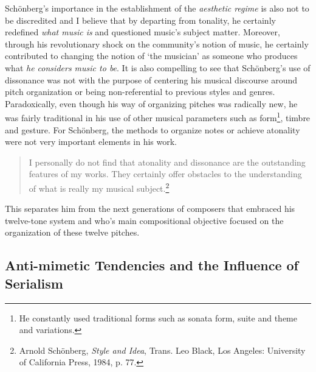 Sch\"{o}nberg's importance in the establishment of the \emph{aesthetic regime} is also not to be discredited and I believe that by departing from tonality, he certainly redefined \emph{what music is} and questioned music's subject matter. Moreover, through his revolutionary shock on the community's notion of music, he certainly contributed to changing the notion of `the musician' as someone who produces what \emph{he considers music to be}. It is also compelling to see that Sch\"{o}nberg's use of dissonance was not with the purpose of centering his musical discourse around pitch organization or being non-referential to previous styles and genres. Paradoxically, even though his way of organizing pitches was radically new, he was fairly traditional in his use of other musical parameters such as form\footnote{He constantly used traditional forms such as sonata form, suite and theme and variations.}, timbre and gesture. For Sch\"{o}nberg, the methods to organize notes or achieve atonality were not very important elements in his work.

\begin{quote}
I personally do not find that atonality and dissonance are the outstanding features of my works. They certainly offer obstacles to the understanding of what is really my musical subject.\footnote{Arnold Sch\"{o}nberg, \emph{Style and Idea}, Trans. Leo Black, Los Angeles: University of California Press, 1984, p. 77.}
\end{quote}
This separates him from the next generations of composers that embraced his twelve-tone system and who's main compositional objective focused on the organization of these twelve pitches. 

\subsection{Anti-mimetic Tendencies and the Influence of Serialism}

